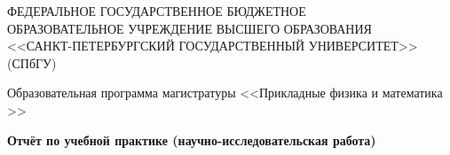 \begin{titlepage}
    \begin{center} 
        
        

        \large{
           \MakeUppercase{Федеральное государственное бюджетное \\ образовательное учреждение высшего образования \\<<Санкт-Петербургский государственный университет>>} \\(СПбГУ)
        }

        \vfill

        Образовательная программа магистратуры <<Прикладные физика и математика >>

        \vfill

        \begin{figure}[h]
        \end{figure}

        

        \vfill

        

        {\Large \bfseries Отчёт по учебной практике (научно-исследовательская работа)}



\end{center}
\end{titlepage}
